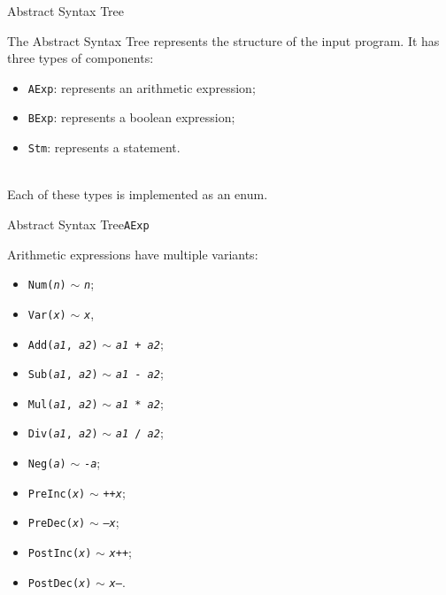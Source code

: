 \documentclass{beamer}
\begin{document}
\begin{frame}{Abstract Syntax Tree}

    The Abstract Syntax Tree represents the structure of the input program.
    It has three types of components:
    \begin{itemize}
        \item \texttt{AExp}: represents an arithmetic expression;
        \item \texttt{BExp}: represents a boolean expression;
        \item \texttt{Stm}: represents a statement.
    \end{itemize}

    ~\\
    Each of these types is implemented as an enum.

\end{frame}

\begin{frame}{Abstract Syntax Tree}{\texttt{AExp}}

    Arithmetic expressions have multiple variants:
    \begin{itemize}
        \item \texttt{Num(\textit{n})} $\sim$ \texttt{\textit{n}};
        \item \texttt{Var(\textit{x})} $\sim$ \texttt{\textit{x}},
        \item \texttt{Add(\textit{a1}, \textit{a2})} $\sim$ \texttt{\textit{a1} + \textit{a2}};
        \item \texttt{Sub(\textit{a1}, \textit{a2})} $\sim$ \texttt{\textit{a1} - \textit{a2}};
        \item \texttt{Mul(\textit{a1}, \textit{a2})} $\sim$ \texttt{\textit{a1} * \textit{a2}};
        \item \texttt{Div(\textit{a1}, \textit{a2})} $\sim$ \texttt{\textit{a1} / \textit{a2}};
        \item \texttt{Neg(\textit{a})} $\sim$ \texttt{-\textit{a}};
        \item \texttt{PreInc(\textit{x})} $\sim$ \texttt{++\textit{x}};
        \item \texttt{PreDec(\textit{x})} $\sim$ \texttt{--\textit{x}};
        \item \texttt{PostInc(\textit{x})} $\sim$ \texttt{\textit{x}++};
        \item \texttt{PostDec(\textit{x})} $\sim$ \texttt{\textit{x}--}.
    \end{itemize}

\end{frame}
\end{document}
